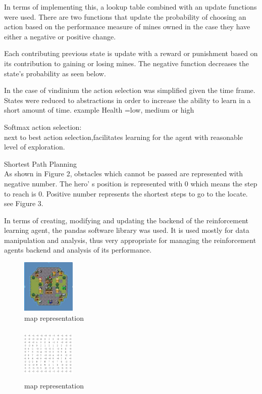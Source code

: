 In terms of implementing this, a lookup table combined with an update functions were used. There are two functions that update the probability of choosing an action based on the performance measure of mines owned in the case they have either a negative or positive change. 

Each contributing previous state is update with a reward or punishment based on its contribution to gaining or losing mines. The negative function decreases the state's probability as seen below.

In the case of vindinium the action selection was simplified given the time frame. States were reduced to abstractions in order to increase the ability to learn in a short amount of time. example Health =low, medium or high

Softmax action selection:\\
next to best action selection,facilitates learning for the agent with reasonable level of exploration.
 


 
Shortest Path Planning\\

As shown in Figure 2, obstacles which cannot be passed are represented with negative number. The hero’ s position is represented with 0 which means the step to reach is 0. Positive number represents the shortest steps to go to the locate. see Figure 3.

In terms of creating, modifying and updating the backend of the reinforcement learning agent, the pandas software library was used. It is used mostly for data manipulation and analysis, thus very appropriate for managing the reinforcement agents backend and analysis of its performance.



\begin{figure}
\includegraphics[height=1in, width=1in]{move1.jpg}
\caption{map representation}
\end{figure}

\begin{figure}
\includegraphics[height=1in, width=1in]{move2.jpg}
\caption{map representation}
\end{figure}

